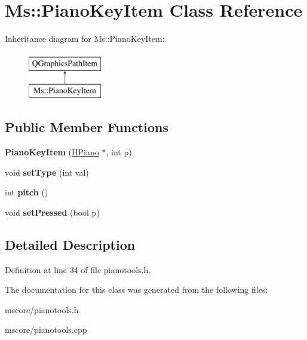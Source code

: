 \hypertarget{class_ms_1_1_piano_key_item}{}\section{Ms\+:\+:Piano\+Key\+Item Class Reference}
\label{class_ms_1_1_piano_key_item}
Inheritance diagram for Ms\+:\+:Piano\+Key\+Item\+:\begin{figure}[H]
\begin{center}
\leavevmode
\includegraphics[height=2.000000cm]{class_ms_1_1_piano_key_item}
\end{center}
\end{figure}
\subsection*{Public Member Functions}
\begin{DoxyCompactItemize}
\item 
\mbox{\label{class_ms_1_1_piano_key_item_accbe054e5dd47af2c3ee9763786bde53}} 
{\bfseries Piano\+Key\+Item} (\hyperlink{class_ms_1_1_h_piano}{H\+Piano} $\ast$, int p)
\item 
\mbox{\label{class_ms_1_1_piano_key_item_a3479b76a626bba4d75bd9272b6fb5b4c}} 
void {\bfseries set\+Type} (int val)
\item 
\mbox{\label{class_ms_1_1_piano_key_item_a0b170ed40dfc119682a9d78a43aeedd4}} 
int {\bfseries pitch} ()
\item 
\mbox{\label{class_ms_1_1_piano_key_item_ad7bf7ac4e48c8bc662032ef1a7124148}} 
void {\bfseries set\+Pressed} (bool p)
\end{DoxyCompactItemize}


\subsection{Detailed Description}


Definition at line 34 of file pianotools.\+h.



The documentation for this class was generated from the following files\+:\begin{DoxyCompactItemize}
\item 
mscore/pianotools.\+h\item 
mscore/pianotools.\+cpp\end{DoxyCompactItemize}
